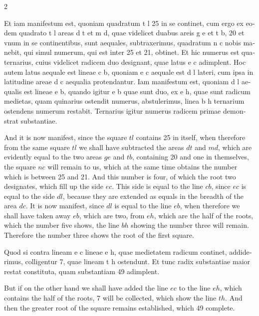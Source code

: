\documentclass[11pt,a4paper,twoside]{book}
\newcommand{\latincolumn}[1]{\textlatin{\small #1}}
\begin{document}
\begin{paracol}{2}
\switchcolumn*

\latincolumn{Et iam manifestum est, quoniam quadratum t l 25 in se continet, cum ergo ex eodem quadrato t l areas d t et m d, quae videlicet duabus areis g e et t b, 20 et vnum in se continentibus, sunt aequales, subtraxerimus, quadratum n c nobis manebit, qui simul numerum, qui est inter 25 et 21, obtinet. Et hic numerus est quaternarius, cuius videlicet radicem duo designant, quae latus e c adimplent. Hoc autem latus aequale est lineae c b, quoniam e c aequale est d l lateri, cum ipsa in latitudine areae d c aequalia protendantur. Iam manifestum est, quoniam d l aequalis est lineae e b, quando igitur e b quae sunt duo, ex e h, quae sunt radicum medietas, quam quinarius ostendit numerus, abstulerimus, linea b h ternarium ostendens numerum restabit. Ternarius igitur numerus radicem primae demonstrat substantiae.}

\switchcolumn

And it is now manifest, since the square $tl$ contains 25 in itself, when therefore from the same square $tl$ we shall have subtracted the areas $dt$ and $md$, which are evidently equal to the two areas $ge$ and $tb$, containing 20 and one in themselves, the square $nc$ will remain to us, which at the same time obtains the number which is between 25 and 21. And this number is four, of which the root two designates, which fill up the side $ec$. This side is equal to the line $cb$, since $ec$ is equal to the side $dl$, because they are extended as equals in the breadth of the area $dc$. It is now manifest, since $dl$ is equal to the line $eb$, when therefore we shall have taken away $eb$, which are two, from $eh$, which are the half of the roots, which the number five shows, the line $bh$ showing the number three will remain. Therefore the number three shows the root of the first square.

\switchcolumn*

\latincolumn{Quod si contra lineam e c lineae e h, quae medietatem radicum continet, addiderimus, colligentur 7, quae lineam t h ostendunt. Et tunc radix substantiae maior restat constituta, quam substantiam 49 adimplent.}

\switchcolumn

But if on the other hand we shall have added the line $ec$ to the line $eh$, which contains the half of the roots, 7 will be collected, which show the line $th$. And then the greater root of the square remains established, which 49 complete.

\switchcolumn*

\end{paracol}
\end{document}
